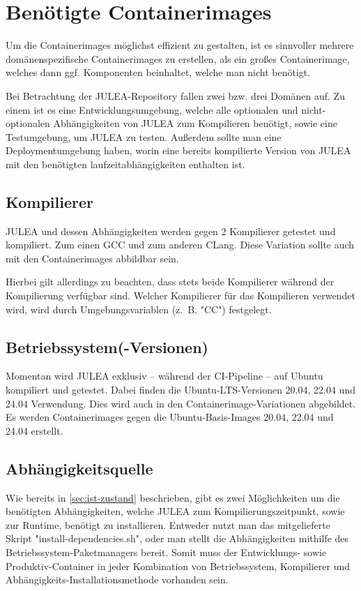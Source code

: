 \section{Benötigte Containerimages}

Um die Containerimages möglichst effizient zu gestalten, ist es sinnvoller mehrere domänenspezifische Containerimages zu erstellen, als ein großes Containerimage, welches dann ggf. Komponenten beinhaltet, welche man nicht benötigt.

Bei Betrachtung der JULEA-Repository fallen zwei bzw. drei Domänen auf. Zu einem ist es eine Entwicklungsumgebung, welche alle optionalen und nicht-optionalen Abhängigkeiten von JULEA zum Kompilieren benötigt, sowie eine Testumgebung, um JULEA zu testen. Außerdem sollte man eine Deploymentumgebung haben, worin eine bereits kompilierte Version von JULEA mit den benötigten laufzeitabhängigkeiten enthalten ist.

\subsection{Kompilierer}

JULEA und dessen Abhängigkeiten werden gegen 2 Kompilierer getestet und kompiliert. Zum einen GCC und zum anderen CLang.
Diese Variation sollte auch mit den Containerimages abbildbar sein. 

Hierbei gilt allerdings zu beachten, dass stets beide Kompilierer während der Kompilierung verfügbar sind. Welcher Kompilierer für das Kompilieren verwendet wird, wird durch Umgebungsvariablen (z. B. "CC") festgelegt.  

\subsection{Betriebssystem(-Versionen)}

Momentan wird JULEA exklusiv – während der CI-Pipeline – auf Ubuntu kompiliert und getestet. Dabei finden die Ubuntu-LTS-Versionen 20.04, 22.04 und 24.04 Verwendung. Dies wird auch in den Containerimage-Variationen abgebildet. Es werden Containerimages gegen die Ubuntu-Basis-Images 20.04, 22.04 und 24.04 erstellt.

\subsection{Abhängigkeitsquelle}

Wie bereits in \cref{sec:ist-zustand} beschrieben, gibt es zwei Möglichkeiten um die benötigten Abhängigkeiten, welche JULEA zum Kompilierungszeitpunkt, sowie zur Runtime, benötigt zu installieren. Entweder nutzt man das mitgelieferte Skript "install-dependencies.sh", oder man stellt die Abhängigkeiten mithilfe des Betriebssystem-Paketmanagers bereit. Somit muss der Entwicklungs- sowie Produktiv-Container in jeder Kombination von Betriebssystem, Kompilierer und Abhängigkeits-Installationsmethode vorhanden sein.

